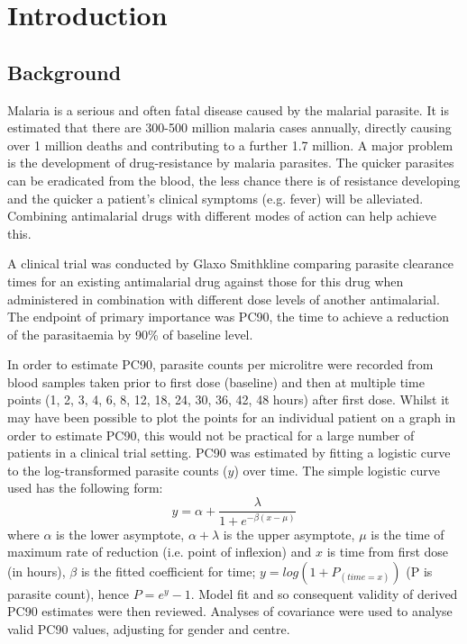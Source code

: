 \chapter{Introduction}
\section*{Background}
Malaria is a serious and often fatal disease caused by the malarial parasite. It is estimated that there are 300-500 million malaria cases annually, directly causing over 1 million deaths and contributing to a further 1.7 million. A major problem is the development of drug-resistance by malaria parasites. The quicker parasites can be eradicated from the blood, the less chance there is of resistance developing and the quicker a patient's clinical symptoms (e.g. fever) will be alleviated. Combining antimalarial drugs with different modes of action can help achieve this. 

A clinical trial was conducted by Glaxo Smithkline comparing parasite clearance times for an existing antimalarial drug against those for this drug when administered in combination with different dose levels of another antimalarial. The endpoint of primary importance was PC90, the time to achieve a reduction of the parasitaemia by 90\% of baseline level.

In order to estimate PC90, parasite counts per microlitre were recorded from blood samples taken prior to first dose (baseline) and then at multiple time points (1, 2, 3, 4, 6, 8, 12, 18, 24, 30, 36, 42, 48 hours) after first dose. Whilst it may have been possible to plot the points for an individual patient on a graph in order to estimate PC90, this would not be practical for a large number of patients in a clinical trial setting. PC90 was estimated by fitting a logistic curve to the log-transformed parasite counts ($y$) over time. The simple logistic curve used has the following form: 
$$
y=\alpha+\frac{\lambda}{1+e^{-\beta(x-\mu)}}
$$
where $\alpha$ is the lower asymptote, $\alpha+\lambda$ is the upper asymptote, $\mu$ is the time of maximum rate of reduction (i.e. point of inflexion) and $x$ is time from first dose (in hours), $\beta$ is the fitted coefficient for time; $y = log(1 + P_{(time=x)})$ (P is parasite count), hence $P = e^{y}-1$. Model fit and so consequent validity of derived PC90 estimates were then reviewed. Analyses of covariance were used to analyse valid PC90 values, adjusting for gender and centre.
